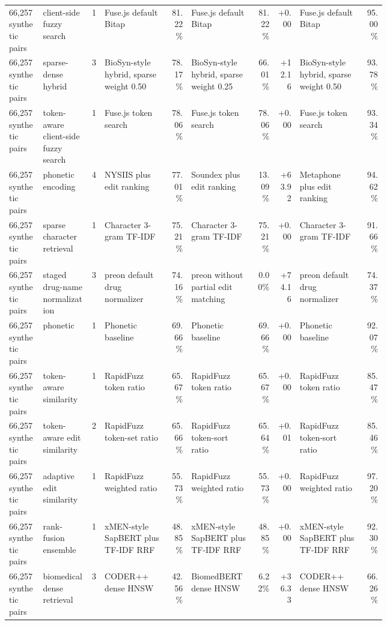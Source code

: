 \begin{landscape}
\begin{tiny}
\begin{longtable}{@{}L{0.09\linewidth}L{0.13\linewidth}rL{0.17\linewidth}rL{0.17\linewidth}rrL{0.17\linewidth}r@{}}
66,257 synthetic pairs & client-side fuzzy search & 1 & Fuse.js default Bitap & 81.22\% & Fuse.js default Bitap & 81.22\% & +0.00 & Fuse.js default Bitap & 95.00\% \\
66,257 synthetic pairs & sparse-dense hybrid & 3 & BioSyn-style hybrid, sparse weight 0.50 & 78.17\% & BioSyn-style hybrid, sparse weight 0.25 & 66.01\% & +12.16 & BioSyn-style hybrid, sparse weight 0.50 & 93.78\% \\
66,257 synthetic pairs & token-aware client-side fuzzy search & 1 & Fuse.js token search & 78.06\% & Fuse.js token search & 78.06\% & +0.00 & Fuse.js token search & 93.34\% \\
66,257 synthetic pairs & phonetic encoding & 4 & NYSIIS plus edit ranking & 77.01\% & Soundex plus edit ranking & 13.09\% & +63.92 & Metaphone plus edit ranking & 94.62\% \\
66,257 synthetic pairs & sparse character retrieval & 1 & Character 3-gram TF-IDF & 75.21\% & Character 3-gram TF-IDF & 75.21\% & +0.00 & Character 3-gram TF-IDF & 91.66\% \\
66,257 synthetic pairs & staged drug-name normalization & 3 & preon default drug normalizer & 74.16\% & preon without partial edit matching & 0.00\% & +74.16 & preon default drug normalizer & 74.37\% \\
66,257 synthetic pairs & phonetic & 1 & Phonetic baseline & 69.66\% & Phonetic baseline & 69.66\% & +0.00 & Phonetic baseline & 92.07\% \\
66,257 synthetic pairs & token-aware similarity & 1 & RapidFuzz token ratio & 65.67\% & RapidFuzz token ratio & 65.67\% & +0.00 & RapidFuzz token ratio & 85.47\% \\
66,257 synthetic pairs & token-aware edit similarity & 2 & RapidFuzz token-set ratio & 65.66\% & RapidFuzz token-sort ratio & 65.64\% & +0.01 & RapidFuzz token-sort ratio & 85.46\% \\
66,257 synthetic pairs & adaptive edit similarity & 1 & RapidFuzz weighted ratio & 55.73\% & RapidFuzz weighted ratio & 55.73\% & +0.00 & RapidFuzz weighted ratio & 97.20\% \\
66,257 synthetic pairs & rank-fusion ensemble & 1 & xMEN-style SapBERT plus TF-IDF RRF & 48.85\% & xMEN-style SapBERT plus TF-IDF RRF & 48.85\% & +0.00 & xMEN-style SapBERT plus TF-IDF RRF & 92.30\% \\
66,257 synthetic pairs & biomedical dense retrieval & 3 & CODER++ dense HNSW & 42.56\% & BiomedBERT dense HNSW & 6.22\% & +36.33 & CODER++ dense HNSW & 66.26\% \\

\end{longtable}
\end{tiny}
\end{landscape}
